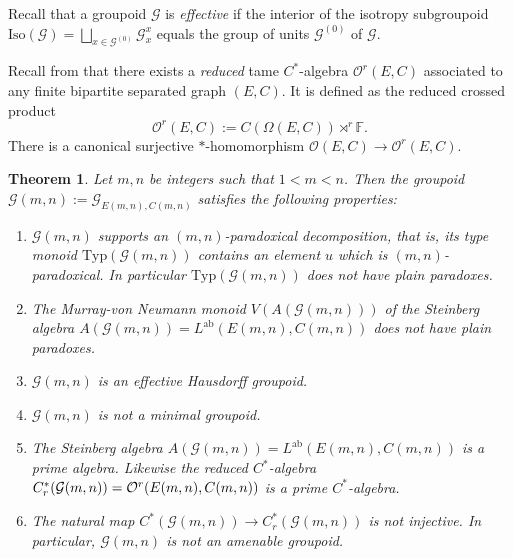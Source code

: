\documentclass[11pt]{amsart}
\newcommand{\Lab}{L^{{\mathrm{ab}}}}
\theoremstyle{plain}            %
\newtheorem{theorem}{Theorem}[section]
\theoremstyle{definition}       %
\theoremstyle{definition}       %
\theoremstyle{remark}
\newcommand{\Typ}{\mathrm{Typ}}
\begin{document}
  Recall that a groupoid $\mathcal G$ is {\it effective} if the interior of the isotropy subgroupoid $\text{Iso} (\mathcal G) = \bigsqcup_{x\in \mathcal G^{(0)}} \mathcal G_x^x$ 
 equals the group of units $\mathcal G^{(0)}$ of $\mathcal G$. 

Recall from \cite{ae14} that there exists a {\it reduced} tame $C^*$-algebra $\mathcal O ^r (E,C)$ associated to any
finite bipartite separated graph $(E,C)$. It is defined as the reduced crossed product
$$\mathcal O ^r (E,C) := C(\Omega (E,C)) \rtimes ^r \mathbb F .$$
There is a canonical surjective $*$-homomorphism $\mathcal O (E,C) \to \mathcal O^r (E,C)$.


\begin{theorem}
\label{thm:properties-ofGmn} Let $m,n$ be integers such that $1<m<n$. Then the groupoid $\mathcal G (m,n) := \mathcal G_{E(m,n),C(m,n)}$ satisfies the following properties:
\begin{enumerate}
\item $\mathcal G (m,n)$ supports an $(m,n)$-paradoxical decomposition, that is, its type monoid $\Typ (\mathcal G (m,n))$ contains an element $u$ which is $(m,n)$-paradoxical. In particular
$\Typ (\mathcal G (m,n))$ does not have plain paradoxes.
\item The Murray-von Neumann monoid $V(A(\mathcal G (m,n)))$ of the Steinberg algebra $A(\mathcal G (m,n)) = \Lab (E(m,n),C(m,n))$ does not have plain paradoxes.
\item $\mathcal G (m,n)$ is an effective Hausdorff groupoid.
 \item $\mathcal G (m,n)$ is not a minimal groupoid.
\item The Steinberg algebra $A (\mathcal G (m,n)) = \Lab (E(m,n),C(m,n))$ is a prime algebra. Likewise the reduced $C^*$-algebra  $C^*_r (\mathcal G (m,n))= \linebreak  \mathcal O^r(E(m,n),C(m,n))$ is a prime $C^*$-algebra. 
 \item The natural map $C^* (\mathcal G (m,n)) \to C^*_r(\mathcal G (m,n))$ is not injective. In particular, $\mathcal G (m,n)$ is not an amenable groupoid.
 \end{enumerate}
\end{theorem}
\end{document}
